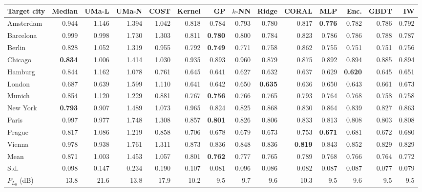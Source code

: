 \begin{tabular}{lrrrrrrrrrrrrr}
\toprule
Target city & Median & UMa-L & UMa-N & COST & Kernel & GP & $k$-NN & Ridge & CORAL & MLP & Enc. & GBDT & IW \\
\midrule
Amsterdam & 0.944 & 1.146 & 1.394 & 1.042 & 0.818 & 0.784 & 0.793 & 0.780 & 0.817 & \textbf{0.776} & 0.782 & 0.786 & 0.792 \\
Barcelona & 0.999 & 0.998 & 1.730 & 1.303 & 0.811 & \textbf{0.780} & 0.800 & 0.784 & 0.823 & 0.786 & 0.786 & 0.788 & 0.787 \\
Berlin & 0.828 & 1.052 & 1.319 & 0.955 & 0.792 & \textbf{0.749} & 0.771 & 0.758 & 0.862 & 0.755 & 0.751 & 0.751 & 0.756 \\
Chicago & \textbf{0.834} & 1.006 & 1.414 & 1.030 & 0.935 & 0.893 & 0.960 & 0.879 & 0.875 & 0.892 & 0.894 & 0.885 & 0.894 \\
Hamburg & 0.844 & 1.162 & 1.078 & 0.761 & 0.645 & 0.641 & 0.627 & 0.632 & 0.637 & 0.629 & \textbf{0.620} & 0.645 & 0.651 \\
London & 0.687 & 0.639 & 1.599 & 1.110 & 0.641 & 0.642 & 0.650 & \textbf{0.635} & 0.636 & 0.650 & 0.643 & 0.661 & 0.673 \\
Munich & 0.854 & 1.120 & 1.229 & 0.881 & 0.767 & \textbf{0.756} & 0.766 & 0.765 & 0.793 & 0.764 & 0.768 & 0.758 & 0.758 \\
New York & \textbf{0.793} & 0.907 & 1.489 & 1.073 & 0.965 & 0.824 & 0.825 & 0.868 & 0.830 & 0.864 & 0.839 & 0.827 & 0.863 \\
Paris & 0.997 & 0.977 & 1.748 & 1.308 & 0.857 & \textbf{0.801} & 0.826 & 0.806 & 0.833 & 0.813 & 0.808 & 0.803 & 0.808 \\
Prague & 0.817 & 1.086 & 1.219 & 0.858 & 0.706 & 0.678 & 0.679 & 0.673 & 0.753 & \textbf{0.671} & 0.681 & 0.672 & 0.680 \\
Vienna & 0.978 & 0.938 & 1.761 & 1.311 & 0.873 & 0.836 & 0.848 & 0.836 & \textbf{0.819} & 0.843 & 0.852 & 0.829 & 0.829 \\
\midrule
Mean & 0.871 & 1.003 & 1.453 & 1.057 & 0.801 & \textbf{0.762} & 0.777 & 0.765 & 0.789 & 0.768 & 0.766 & 0.764 & 0.772 \\
S.d. & 0.098 & 0.147 & 0.234 & 0.190 & 0.107 & 0.081 & 0.096 & 0.086 & 0.082 & 0.087 & 0.087 & 0.077 & 0.079 \\
\midrule
$P_{L_0}$ (dB) & 13.8 & 21.6 & 13.8 & 17.9 & 10.2 & 9.5 & 9.7 & 9.6 & 10.3 & 9.5 & 9.6 & 9.5 & 9.5 \\
\bottomrule
\end{tabular}
